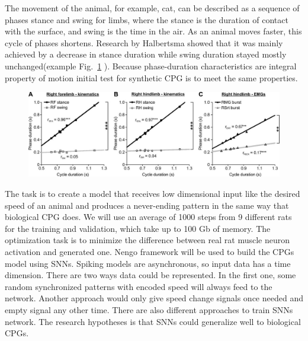 The movement of the animal, for example, cat, can be described as a sequence of phases stance and swing for limbs, where the stance is the duration of contact with the surface, and swing is the time in the air. As an animal moves faster, this cycle of phases shortens. Research by Halbertsma \cite{ref24_1} showed that it was mainly achieved by a decrease in stance duration while swing duration stayed mostly unchanged(example Fig.~\ref{fig3} ). Because phase-duration characteristics are integral property of motion initial test for synthetic CPG is to meet the same properties.

\begin{figure}
\includegraphics[width=\textwidth]{images/images_large_z9k0091424000003.jpeg}

 \label{fig3}

\end{figure}


The task is to create a model that receives low dimensional input like the desired speed of an animal and produces a never-ending pattern in the same way that biological CPG does. We will use an average of 1000 steps from 9 different rats for the training and validation, which take up to 100 Gb of memory. The optimization task is to minimize the difference between real rat muscle neuron activation and generated one. Nengo framework will be used to build the CPGs model using SNNs. Spiking models are asynchronous, so input data has a time dimension. There are two ways data could be represented. In the first one, some random synchronized patterns with encoded speed will always feed to the network. Another approach would only give speed change signals once needed and empty signal any other time. There are also different approaches to train SNNs network. The research hypotheses is that SNNs could generalize well to biological CPGs.

\endinput